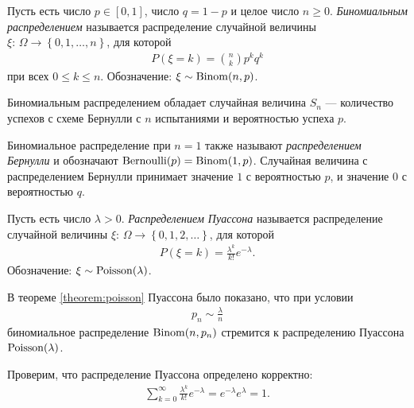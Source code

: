 \documentclass[../main.tex]{subfiles}
\begin{document}
\begin{exmpl} Пусть есть число $ p \in [0,1] $, число $ q = 1 - p $ и целое число $ n \geqslant 0 $. \textit{Биномиальным распределением} называется распределение случайной величины $ \xi \colon\, \Omega \to \left\{ 0, 1, \ldots, n \right\} $, для которой
 \begin{align*}
  P(\xi = k) = \binom n k p^{k}q^{k}
 \end{align*} при всех $ 0 \leqslant k \leqslant n $. Обозначение: $ \xi \sim \mathrm{Binom}(n,p) $.

 Биномиальным распределением обладает случайная величина $ S_n $ --- количество успехов с схеме Бернулли с $ n $ испытаниями и вероятностью успеха $ p $.

 Биномиальное распределение при $ n=1 $ также называют \textit{распределением Бернулли} и обозначают $ \mathrm{Bernoulli}(p) = \mathrm{Binom}(1,p) $. Случайная величина с распределением Бернулли принимает значение $ 1 $ с вероятностью $ p $, и значение $ 0 $ с вероятностью $ q $.
\end{exmpl}
\begin{exmpl}
 Пусть есть число $ \lambda > 0 $. \textit{Распределением Пуассона} называется распределение случайной величины $ \xi\colon\,\Omega\to \left\{ 0,1,2,\ldots \right\} $, для которой
 \begin{align*}
  P(\xi = k) = \frac{\lambda^{k}}{k!} e^{-\lambda}.
 \end{align*} Обозначение: $ \xi \sim  \mathrm{Poisson}(\lambda)$.

 В теореме \ref{theorem:poisson} Пуассона было показано, что при условии
 \begin{align*}
  p_n \sim \frac{\lambda}{n}
 \end{align*} биномиальное распределение $ \mathrm{Binom}(n,p_n) $ стремится к распределению Пуассона $ \mathrm{Poisson}(\lambda) $. 

 Проверим, что распределение Пуассона определено корректно:
 \begin{align*}
  \sum_{k=0}^{\infty} \frac{\lambda^{k}}{k!}e^{-\lambda} = e^{-\lambda} e^{\lambda} = 1.
 \end{align*} 
\end{exmpl}
\end{document}
